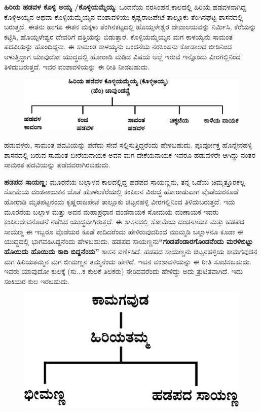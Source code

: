 \textbf{ಹಿರಿಯ ಹಡವಳ ಕೊಳ್ಳಿ ಅಯ್ಯ /ಕೊಳ್ಳಿಯಮ್ಮೆಯ್ಯ}: ಒಂದನೆಯ ನರಸಿಂಹನ ಕಾಲದಲ್ಲಿ ಹಿರಿಯ ಹಡವಳನಾಗಿದ್ದ ಕೊಳ್ಳಿಅಯ್ಯನ ಅಥವಾ ಕೊಳ್ಳಿಯಮ್ಮೆಯ್ಯನ ವಂಶಾವಳಿಯು ಕೃಷ್ಣರಾಜಪೇಟೆ ತಾಲ್ಲೂಕು ತೆಂಗಿನಘಟ್ಟ ಶಾಸನದಲ್ಲಿ ಬರುತ್ತದೆ. ಈತನು ಹಾಗೂ ಈತನ ಮಕ್ಕಳು ತೆಂಗಿನಕಟ್ಟದಲ್ಲಿ ಹೊಯ್ಸಳೇಶ್ವರ ದೇವಾಲಯವನ್ನು ನಿರ್ಮಿಸಿ, ಕೆರೆಯನ್ನು ಕಟ್ಟಿಸಿ, ಹೊಯ್ಸಳೇಶ್ವರ ದೇವರಿಗೆ ದತ್ತಿಯನ್ನು ಬಿಡುತ್ತಾರೆ. ಕೊಳ್ಳಿಯಮ್ಮೆಯ್ಯನ ಮಗ ಕಾಳಯ್ಯನು ಸಾಮಂತ ಪದವಿಯನ್ನು ಹೊಂದಿದ್ದನು. ಈ ಸಾಮಂತ ಕಾಳಯ್ಯನು ಒಂದನೆಯ ನರಸಿಂಹನು ಕೋಡಾಲದ ಬೀಡಿನಿಂದ ಆಳುತ್ತಿದ್ದಾಗ ಯಾವುದೋ ಯುದ್ಧದಲ್ಲಿ ಹೋರಾಡಿ ಮಡಿದ ವಿಷಯ ಅಲ್ಲೆ ಇರುವ ಇನ್ನೊಂದು ವೀರಗಲ್ಲಿನಿಂದ ತಿಳಿದುಬರುತ್ತದೆ. ಇವರ ವಂಶಾವಳಿಯನ್ನು ಈ ರೀತಿ ನೀಡಬಹುದು.

\newpage

\begin{figure}[H]
\includegraphics[scale=1.25]{images/chap3/chap3fig33.jpeg}
\end{figure}

ಹಡುವಳರು, ಸಾಮಂತ ಪದವಿಯನ್ನು ಪಡೆದು ಸೇವೆ ಸಲ್ಲಿಸುತ್ತಿದ್ದರೆಂದು ಹೇಳಬಹುದು. ಪೂರ್ವೋಕ್ತ ಹೊನ್ನೇನಹಳ್ಳಿ ಶಾಸನದಲ್ಲಿ ಬರುವ ಸಾಮಂತ ಬೀರೆಯನಾಯಕ ಅವನ ಮಗ ದೇಕೆಯನಾಯಕ ಇವರೂ ಹಡುವಳರೇ ಆಗಿದ್ದು ನಂತರ ಸಾಮಂತ ಪದವಿಯನ್ನು ಪಡೆದವರಾಗಿರಬಹುದು.

\textbf{ಹಡಪದ ಸಾಯಣ್ಣ:} ಮೂರನೆಯ ಬಲ್ಲಾಳನ ಕಾಲದಲ್ಲಿದ್ದ ಹಡಪದ ಸಾಯಣ್ಣನು, ತನ್ನ ಒಡೆಯ ಚಿಮ್ಮತ್ತೂರಕಲ್ಲ ಸೋಮೆಯ ದಂಡನಾಯಕನ ಜೊತೆ ಹೊಳಲಕೆರೆಯಲ್ಲಿ ಕಂಪಿಲನ ವಿರುದ್ಧ ಹೋರಾಡುವಾಗ ವೊಡೆಯರಕೂಡೆ ಹೋರಾಡಿ ಮೃತಪಟ್ಟನೆಂದು ಕೃಷ್ಣರಾಜಪೇಟೆ ತಾಲ್ಲೂಕು ಚಿಟ್ಟನಹಳ್ಳಿ ವೀರಗಲ್ಲಿನಿಂದ ತಿಳಿದುಬರುತ್ತದೆ. ಇದು ಮೂರನೆಯ ಬಲ್ಲಾಳ ಮತ್ತು ಅವನ ಮಹಾಪ್ರಧಾನ ದಂಡನಾಯಕ ಸೋಮಯೆ ದಂಣಾಯಕ ಇವರು ಕಂಪಿಲದೇವನೊಡನೆ ನಡೆಸಿದ ಯುದ್ಧವಾಗಿರುತ್ತದೆ. ಈ ಶಾಸನದಲ್ಲಿ ಸೋಮೆಯ ದಂಡನಾಯಕ ಮತ್ತು ಹಡಪದ ಸಾಯಣ್ಣ ಈ ಇಬ್ಬರೂ ವೊಡೆಯರ ಕೂಡೆ ಕಾದಿದರೆಂದು ಹೇಳಿರುವುದರಿಂದ ಮುಮ್ಮಡಿ ಬಲ್ಲಾಳನೂ ಕೂಡಾ ಈ ಯುದ್ಧದಲ್ಲಿ ಭಾಗವಹಿಸಿದ್ದನೆಂದು ಹೇಳಬಹುದು. ಹಡಪದ ಸಾಯಣ್ಣನು\break \textbf{“ಗಂಡಪೆಂಡಾರಗೊಂಡನೆಂದು ಮರಳಿಬಿಟ್ಟು ಹೊಯಿದು ಹೊಯಿದು ಕಾದಿ ಬಿದ್ದನೆಂದು”} ಶಾಸನ ವರ್ಣಿಸಿದೆ. ಹಡಪದ ಸಾಯಣ್ಣನು ಚಿಟ್ಟನಹಳ್ಳಿಯ ಕಾಮಗವುಡನ ಮಗ ಹಿರಿಯತಮ್ಮನ ಮಗ ಬೀಮಣ್ಣನ ತಮ್ಮನೆಂದು ಹೇಳಿದೆ. ಇವನ ವಂಶಾವಳಿಯನ್ನು ಈ ರೀತಿ ಸೂಚಿಸಬಹುದು. ಇವರು ಯಾವುದೋ ಕುಲಕ್ಕೆ (ಸು...ಕ ಕುಲಕೆ ತಿಲಕರು) ಸೇರಿದವರೆಂದು ಹೇಳಿದ್ದು ಅದು ತ್ರುಟಿತವಾಗಿದೆ. ಇದು ಸಂಕಿಯರ ಕುಲ ಇರಬಹುದು.

\begin{figure}[H]
\includegraphics[scale=1.2]{images/chap3/chap3fig34.jpeg}
\end{figure}


